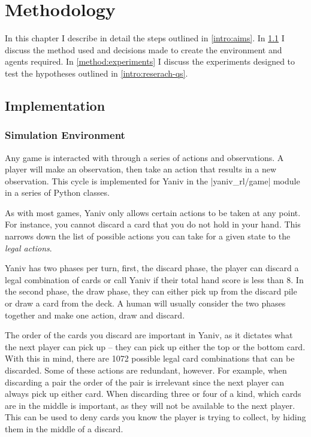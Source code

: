 \documentclass[../main.tex]{subfiles}
\begin{document}
\chapter{Methodology}
\label{cha:Methodology}
In this chapter I describe in detail the steps outlined in \cref{intro:aims}. In \cref{method:implementation} I discuss the method used and decisions made to create the environment and agents required. In \cref{method:experiments} I discuss the experiments designed to test the hypotheses outlined in \cref{intro:reserach-qs}. 

\section{Implementation} \label{method:implementation}
\subsection{Simulation Environment}
Any game is interacted with through a series of actions and observations. A player will make an observation, then take an action that results in a new observation. This cycle is implemented for Yaniv in the |yaniv_rl/game| module in a series of Python classes. 

As with most games, Yaniv only allows certain actions to be taken at any point. For instance, you cannot discard a card that you do not hold in your hand. This narrows down the list of possible actions you can take for a given state to the \textit{legal actions}.

Yaniv has two phases per turn, first, the discard phase, the player can discard a legal combination of cards or call Yaniv if their total hand score is less than 8. In the second phase, the draw phase, they can either pick up from the discard pile or draw a card from the deck. A human will usually consider the two phases together and make one action, draw and discard. 

The order of the cards you discard are important in Yaniv, as it dictates what the next player can pick up -- they can pick up either the top or the bottom card. With this in mind, there are 1072 possible legal card combinations that can be discarded. Some of these actions are redundant, however. For example, when discarding a pair the order of the pair is irrelevant since the next player can always pick up either card. When discarding three or four of a kind, which cards are in the middle is important, as they will not be available to the next player. This can be used to deny cards you know the player is trying to collect, by hiding them in the middle of a discard. 
\end{document}

